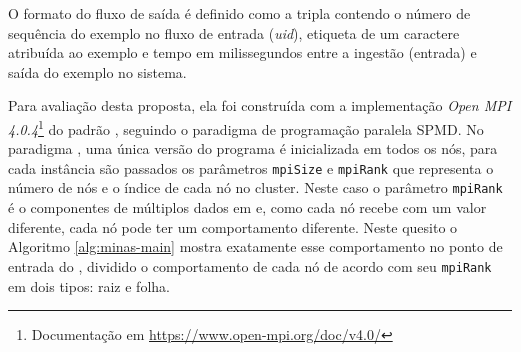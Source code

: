 O formato do fluxo de saída é definido como a tripla contendo o número de
sequência do exemplo no fluxo de entrada (\emph{uid}), etiqueta de um caractere
atribuída ao exemplo e tempo em milissegundos entre a ingestão (entrada) e saída
do exemplo no sistema.


Para avaliação desta proposta, ela foi construída com a implementação \emph{Open
MPI 4.0.4}\footnote{Documentação em \url{https://www.open-mpi.org/doc/v4.0/}} do
padrão \mpi, seguindo o paradigma de programação paralela \acf{SPMD}.
No paradigma \spmd, uma única versão do programa é inicializada em todos os nós,
para cada instância são passados os parâmetros \texttt{mpiSize} e
\texttt{mpiRank} que representa o número de nós e o índice de cada nó no
cluster.
Neste caso o parâmetro \texttt{mpiRank} é o componentes de múltiplos dados em
\spmd e, como cada nó recebe com um valor diferente, cada nó pode ter um
comportamento diferente.
Neste quesito o Algoritmo \ref{alg:minas-main} mostra exatamente esse
comportamento no ponto de entrada do \mfog, dividido o comportamento de cada nó
de acordo com seu \texttt{mpiRank} em dois tipos: raiz e folha.


